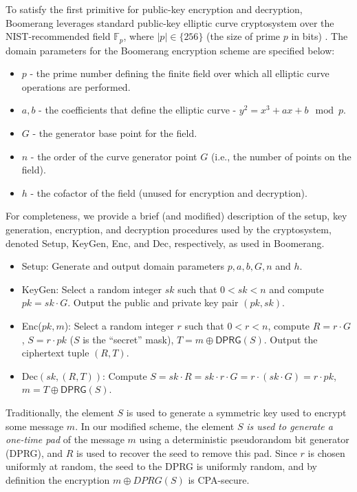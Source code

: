 To satisfy the first primitive for public-key encryption and decryption, Boomerang leverages standard public-key elliptic curve cryptosystem over the NIST-recommended field $\mathbb{F}_{p}$, where $|p| \in \{256\}$ (the size of prime $p$ in bits) \cite{nist-curves}. The domain parameters for the Boomerang encryption scheme are specified below:
\begin{itemize}
	\item $p$ - the prime number defining the finite field over which all elliptic curve operations are performed.
	\item $a, b$ - the coefficients that define the elliptic curve - $y^2 = x^3 +ax + b \mod p$.
	\item $G$ - the generator base point for the field.
	\item $n$ - the order of the curve generator point $G$ (i.e., the number of points on the field).
	\item $h$ - the cofactor of the field (unused for encryption and decryption).
\end{itemize}
For completeness, we provide a brief (and modified) description of the setup, key generation, encryption, and decryption procedures used by the cryptosystem, denoted {\sf Setup}, {\sf KeyGen}, {\sf Enc}, and {\sf Dec}, respectively, as used in Boomerang. 
\begin{itemize}
	\item {\sf Setup}: Generate and output domain parameters $p,a,b,G,n$ and $h$. 
	\item {\sf KeyGen}: Select a random integer $sk$ such that $0 < sk < n$ and compute $pk = sk \cdot G$. Output the public and private key pair $(pk, sk)$.
	\item {\sf Enc}($pk, m$): Select a random integer $r$ such that $0 < r < n$, compute $R = r \cdot G$, $S = r \cdot pk$ ($S$ is the ``secret'' mask), $T = m \oplus \mathsf{DPRG}(S)$. Output the ciphertext tuple $(R, T)$.
	\item {\sf Dec}$(sk, (R, T))$: Compute $S = sk \cdot R = sk \cdot r \cdot G = r \cdot (sk \cdot G) = r \cdot pk$, $m = T \oplus \mathsf{DPRG}(S)$.
\end{itemize}
Traditionally, the element $S$ is used to generate a symmetric key used to encrypt some message $m$. In our modified scheme, the element $S$ \emph{is used to generate a one-time pad} of the message $m$ using a deterministic pseudorandom bit generator (DPRG), and $R$ is used to recover the seed to remove this pad. Since $r$ is chosen uniformly at random, the seed to the DPRG is uniformly random, and by definition the encryption $m \oplus DPRG(S)$ is CPA-secure. 

